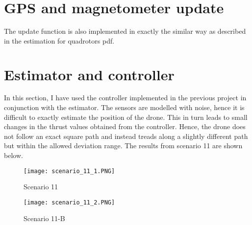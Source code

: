 \documentclass{article}
\begin{document}
\section{GPS and magnetometer update}
The update function is also implemented in exactly the similar way as described in the estimation for quadrotors pdf. 

\section{Estimator and controller}

In this section, I have used the controller implemented in the previous project in conjunction with the estimator. The sensors are modelled with noise, hence it is difficult to exactly estimate the position of the drone. This in turn leads to small changes in the thrust values obtained from the controller. Hence, the drone does not follow an exact square path and instead treads along a slightly different path but within the allowed deviation range. The results from scenario 11 are shown below.

\begin{figure}[h!]
\centering
\texttt{[image: scenario\_11\_1.PNG]}
\caption{Scenario 11}
\label{fig:Scenario 11}
\end{figure}

\begin{figure}[h!]
\centering
\texttt{[image: scenario\_11\_2.PNG]}
\caption{Scenario 11-B}
\label{fig:Scenario 11-B}
\end{figure}


\end{document}
